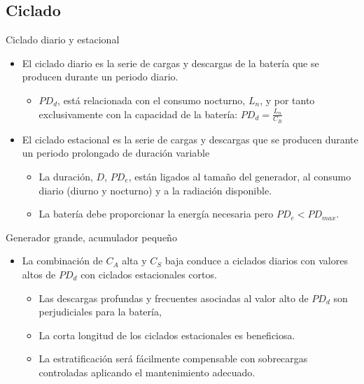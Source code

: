 \documentclass[xcolor={usenames,svgnames,dvipsnames}]{beamer}
\begin{document}
\subsection{Ciclado}
\label{sec-1-3}
\begin{frame}[label=sec-1-3-1]{Ciclado diario y estacional}
\begin{itemize}
\item El \alert{ciclado diario} es la serie de cargas y descargas de la batería
que se producen durante un periodo diario.

\begin{itemize}
\item $PD_{d}$, está relacionada con el consumo nocturno, $L_{n}$, y por
tanto exclusivamente con la capacidad de la batería:
$PD_{d}=\frac{L_{n}}{C_{B}}$
\end{itemize}

\item El \alert{ciclado estacional} es la serie de cargas y descargas que se
producen durante un periodo prolongado de duración variable

\begin{itemize}
\item La duración, $D$, $PD_{e}$, están ligados al tamaño del generador,
al consumo diario (diurno y nocturno) y a la radiación disponible.

\item La batería debe proporcionar la energía necesaria pero
$PD_{e}<PD_{max}$.
\end{itemize}
\end{itemize}
\end{frame}

\begin{frame}[label=sec-1-3-2]{Generador grande, acumulador pequeño}
\begin{itemize}
\item La \alert{combinación de $C_{A}$ alta y $C_{S}$ baja} conduce a ciclados
diarios con valores altos de $PD_{d}$ con ciclados estacionales
cortos.

\begin{itemize}
\item Las descargas profundas y frecuentes asociadas al valor alto de
$PD_{d}$ son perjudiciales para la batería,

\item La corta longitud de los ciclados estacionales es beneficiosa.

\item La estratificación será fácilmente compensable con sobrecargas
controladas aplicando el mantenimiento adecuado.
\end{itemize}
\end{itemize}
\end{frame}
\end{document}
